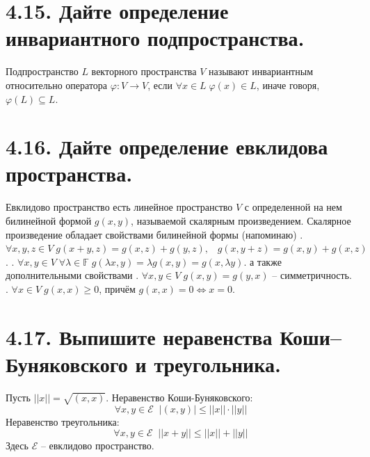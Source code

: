\documentclass{article}
\begin{document}
\section*{\LARGE 4.15. Дайте определение инвариантного подпространства.}
Подпространство $L$ векторного пространства $V$ называют инвариантным относительно оператора $\varphi : V \rightarrow V$, если $\forall x \in L \; \varphi(x) \in L$, иначе говоря, $\varphi(L) \subseteq L$.

\section*{\LARGE 4.16. Дайте определение евклидова пространства.}
Евклидово пространство есть линейное пространство $V$ с определенной на нем билинейной формой $g(x, y)$, называемой скалярным произведением. Скалярное произведение обладает свойствами билинейной формы (напоминаю)
\newline {}. $\forall x, y, z \in V \; g(x + y, z) = g(x, z) + g(y, z),\;\;\; g(x, y + z) = g(x, y) + g(x, z) $.
\newline {}. $\forall x, y \in V \; \forall \lambda \in \mathbb{F} \; g(\lambda x, y) = \lambda g(x, y) =  g(x, \lambda y) $.
\newline а также дополнительными свойствами
\newline {}. $\forall x, y \in V \; g(x, y) = g(y, x)$ -- симметричность.
\newline {}. $\forall x \in V \; g(x, x) \ge 0$, причём $g(x,x) = 0 \Leftrightarrow x = 0$.

\section*{\LARGE 4.17. Выпишите неравенства Коши–Буняковского и треугольника.}
Пусть $||x|| = \sqrt{(x, x)}$.
\newline Неравенство Коши-Буняковского:
$$
\forall x, y \in \mathcal{E} \;\; |(x, y)| \le ||x||\cdot ||y||
$$
Неравенство треугольника:
$$
\forall x,y \in \mathcal{E} \;\; ||x + y|| \le ||x|| + ||y||
$$
Здесь $\mathcal{E}$ -- евклидово пространство.

\end{document}

